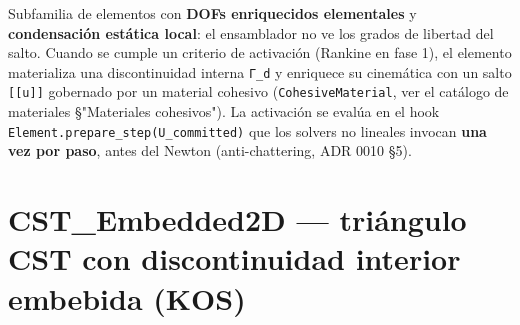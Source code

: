 \documentclass[11pt,letterpaper,oneside]{report}
\begin{document}
Subfamilia de elementos con \textbf{DOFs enriquecidos elementales} y \textbf{condensación estática local}: el ensamblador no ve los grados de libertad del salto. Cuando se cumple un criterio de activación (Rankine en fase 1), el elemento materializa una discontinuidad interna \texttt{Γ\_d} y enriquece su cinemática con un salto \texttt{[[u]]} gobernado por un material cohesivo (\texttt{CohesiveMaterial}, ver el catálogo de materiales §"Materiales cohesivos"). La activación se evalúa en el hook \texttt{Element.prepare\_step(U\_committed)} que los solvers no lineales invocan \textbf{una vez por paso}, antes del Newton (anti-chattering, ADR 0010 §5).

\section{CST\_Embedded2D --- triángulo CST con discontinuidad interior embebida (KOS)}
\end{document}

